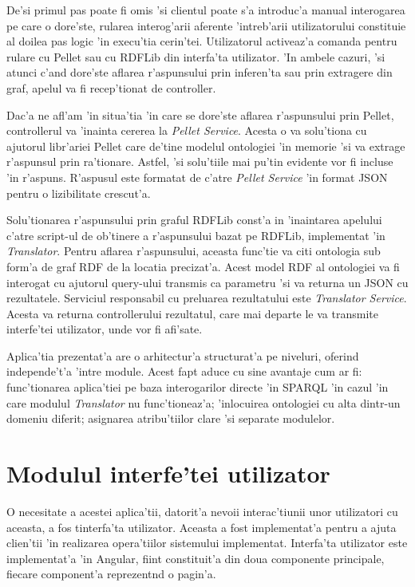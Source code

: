 \documentclass[12pt,a4paper,twoside]{report}
\begin{document}
De'si primul pas poate fi omis 'si clientul poate s'a introduc'a manual interogarea pe care o dore'ste, rularea interog'arii aferente 'intreb'arii utilizatorului constituie al doilea pas logic 'in execu'tia cerin'tei. Utilizatorul activeaz'a comanda pentru rulare cu Pellet sau cu RDFLib din interfa'ta utilizator. 'In ambele cazuri, 'si atunci c'and dore'ste aflarea r'aspunsului prin inferen'ta sau prin extragere din graf, apelul va fi recep'tionat de controller. 

Dac'a ne afl'am 'in situa'tia 'in care se dore'ste aflarea r'aspunsului prin Pellet, controllerul  va 'inainta cererea la {\it Pellet Service}. Acesta o va solu'tiona cu ajutorul libr'ariei Pellet care de'tine modelul ontologiei 'in memorie 'si va extrage r'aspunsul prin ra'tionare. Astfel, 'si solu'tiile mai pu'tin evidente vor fi incluse 'in r'aspuns. R'aspusul este formatat de c'atre {\it Pellet Service} 'in format JSON pentru o lizibilitate crescut'a.

Solu'tionarea r'aspunsului prin graful RDFLib const'a in 'inaintarea apelului c'atre script-ul de ob'tinere a r'aspunsului bazat pe RDFLib, implementat 'in {\it Translator}. Pentru aflarea r'aspunsului, aceasta func'tie va citi ontologia sub form'a de graf RDF de la locatia precizat'a. Acest model RDF al ontologiei va fi interogat cu ajutorul query-ului transmis ca parametru 'si va returna un JSON cu rezultatele. Serviciul responsabil cu preluarea rezultatului este {\it Translator Service}. Acesta va returna controllerului rezultatul, care mai departe le va transmite interfe'tei utilizator, unde vor fi afi'sate.

Aplica'tia prezentat'a are o arhitectur'a structurat'a pe niveluri, oferind independe't'a 'intre module. Acest fapt aduce cu sine avantaje cum ar fi: func'tionarea aplica'tiei pe baza interogarilor directe 'in SPARQL 'in cazul 'in care modulul {\it Translator} nu func'tioneaz'a; 'inlocuirea ontologiei cu alta dintr-un domeniu diferit; asignarea atribu'tiilor clare 'si separate modulelor. 




\section{Modulul interfe'tei utilizator}

O necesitate a acestei aplica'tii, datorit'a nevoii interac'tiunii unor utilizatori cu aceasta, a fos tinterfa'ta utilizator. Aceasta a fost implementat'a pentru a ajuta clien'tii 'in realizarea opera'tiilor sistemului implementat. Interfa'ta utilizator este implementat'a 'in Angular, fiint constituit'a din doua componente principale, fiecare component'a reprezent\ia nd o pagin'a.
\end{document}
